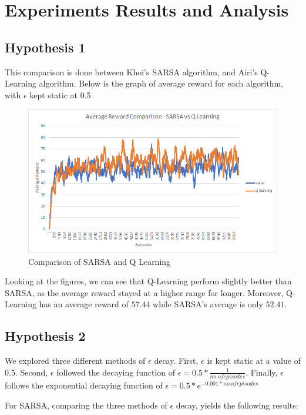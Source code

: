 \section{Experiments Results and Analysis}

\subsection{Hypothesis 1}

This comparison is done between Khoi's SARSA algorithm, and Airi's Q-Learning algorithm. Below is the graph of average reward
for each algorithm, with $\epsilon$ kept static at 0.5

\begin{figure}[H] %
    \centering
    \includegraphics[width=0.7\linewidth]{sarsa-vs-ql.png}
    \caption{Comparison of SARSA and Q Learning}
\end{figure}

Looking at the figures, we can see that Q-Learning perform slightly better than SARSA, as the average reward stayed at a higher range for longer.
Moreover, Q-Learning has an average reward of $57.44$ while SARSA's average is only $52.41$.

\subsection{Hypothesis 2}

We explored three different methods of $\epsilon$ decay. First, $\epsilon$ is kept static at a value of 0.5. Second, 
$\epsilon$ followed the decaying function of $\epsilon = 0.5 * \frac{1}{no. of episodes}$. Finally,
$\epsilon$ follows the exponential decaying function of $\epsilon = 0.5 * e^{-0.001*no. of episodes}$

For SARSA, comparing the three methods of $\epsilon$ decay, yields the following results:

